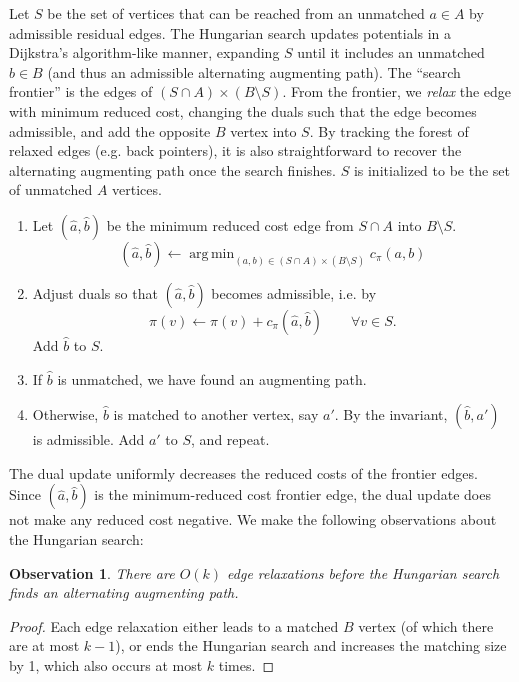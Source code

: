 \documentclass[11pt]{article}
\DeclareMathOperator*{\argmin}{arg\,min}
\theoremstyle{plain}
\newtheorem{observation}{Observation}
\begin{document}
Let $S$ be the set of vertices that can be reached from an unmatched $a \in A$ 
by admissible residual edges.
The Hungarian search updates potentials in a Dijkstra's algorithm-like manner, 
expanding $S$ until it includes an unmatched $b \in B$ (and thus an admissible 
alternating augmenting path).
The ``search frontier'' is the edges of $(S \cap A) \times (B \setminus S)$.
From the frontier, we \emph{relax} the edge with minimum reduced cost, changing 
the duals such that the edge becomes admissible, and add the opposite $B$ 
vertex into $S$.
By tracking the forest of relaxed edges (e.g. back pointers), it is also 
straightforward to recover the alternating augmenting path once the search 
finishes.
$S$ is initialized to be the set of unmatched $A$ vertices.
\begin{enumerate}
\item Let $(\hat{a}, \hat{b})$ be the minimum reduced cost edge from $S \cap A$ 
	into $B \setminus S$.
	\begin{equation*}
		(\hat{a}, \hat{b}) \gets \argmin_{(a, b) \in (S \cap A) \times (B \setminus S)}{c_\pi(a, b)}
	\end{equation*}
\item Adjust duals so that $(\hat{a}, \hat{b})$ becomes admissible, i.e. by
	\begin{equation*}
		\pi(v) \gets \pi(v) + c_\pi(\hat{a}, \hat{b}) \qquad \forall v \in S.
	\end{equation*}
	Add $\hat{b}$ to $S$.
\item If $\hat{b}$ is unmatched, we have found an augmenting path. 
\item Otherwise, $\hat{b}$ is matched to another vertex, say $a'$.
	By the invariant, $(\hat{b}, a')$ is admissible. 
	Add $a'$ to $S$, and repeat.
\end{enumerate}
The dual update uniformly decreases the reduced costs of the frontier edges.
Since $(\hat{a}, \hat{b})$ is the minimum-reduced cost frontier edge, the dual 
update does not make any reduced cost negative.
We make the following observations about the Hungarian search:

\begin{observation}
\label{observation:hungsearch_length}
	There are $O(k)$ edge relaxations before the Hungarian search finds an 
	alternating augmenting path.
\end{observation}
\begin{proof}
	Each edge relaxation either leads to a matched $B$ vertex (of which 
	there are at most $k-1$), or ends the Hungarian search and increases 
	the matching size by 1, which also occurs at most $k$ times.
\end{proof}
\end{document}
